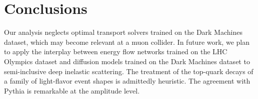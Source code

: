 \section{Conclusions}\label{sec:conclusions}

Our analysis neglects optimal transport solvers trained on the Dark
Machines dataset, which may become relevant at a muon collider. In
future work, we plan to apply the interplay between energy flow networks
trained on the LHC Olympics dataset and diffusion models trained on the
Dark Machines dataset to semi-inclusive deep inelastic scattering. The
treatment of the top-quark decays of a family of light-flavor event
shapes is admittedly heuristic. The agreement with Pythia is remarkable
at the amplitude level.

